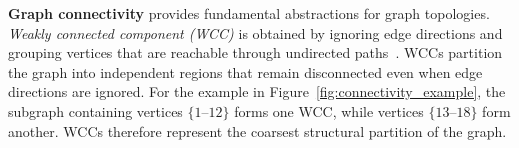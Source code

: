 





\textbf{Graph connectivity}
provides fundamental abstractions for graph topologies.
\textit{Weakly connected component (WCC)}
is obtained by ignoring edge directions and grouping vertices that are reachable through undirected paths~\cite{vishkin1982log}.
WCCs partition the graph into independent regions that remain disconnected even when edge directions are ignored.
For the example in Figure~\ref{fig:connectivity_example}, the subgraph containing vertices $\{1\text{--}12\}$ forms one WCC, while vertices $\{13\text{--}18\}$ form another.
WCCs therefore represent the coarsest structural partition of the graph.

